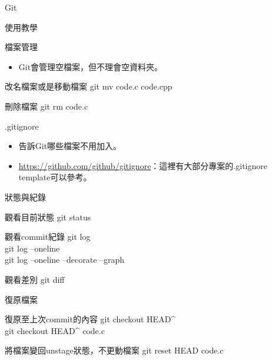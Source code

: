 \documentclass[pdf,16pt]{beamer}
\begin{document}
\begin{section}{Git}
\begin{subsection}{使用教學}
      \begin{frame}{檔案管理}
        \begin{itemize}
          \item Git會管理空檔案，但不理會空資料夾。
        \end{itemize}
        \begin{block}{改名檔案或是移動檔案}
          git mv code.c code.cpp
        \end{block}
        \begin{block}{刪除檔案}
          git rm code.c
        \end{block}
      \end{frame}
      
      \begin{frame}{.gitignore}
        \begin{itemize}
          \item 告訴Git哪些檔案不用加入。
          \item \url{https://github.com/github/gitignore}：這裡有大部分專案的.gitignore template可以參考。
        \end{itemize}
      \end{frame}
      
      \begin{frame}{狀態與紀錄}
        \begin{block}{觀看目前狀態}
          git status
        \end{block}
        \begin{block}{觀看commit紀錄}
          git log\\
          git log --oneline\\
          git log --oneline --decorate --graph
        \end{block}
        \begin{block}{觀看差別}
          git diff
        \end{block}
      \end{frame}
      
      \begin{frame}{復原檔案}
        \begin{block}{復原至上次commit的內容}
          git checkout HEAD\textasciicircum\\
          git checkout HEAD\textasciicircum\phantom{} code.c
        \end{block}
        \begin{block}{將檔案變回unstage狀態，不更動檔案}
          git reset HEAD code.c
        \end{block}
      \end{frame}
      

\end{subsection}
\end{section}
\end{document}
